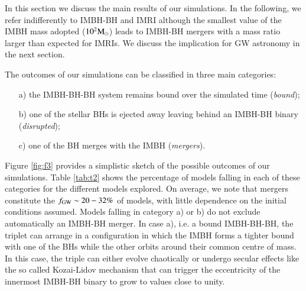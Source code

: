 \documentclass[article]{aa}
\newcommand{\Ms}{{\rm M}_\odot}
\begin{document}
{\bf

In this section we discuss the main results of our simulations. In the following, we refer indifferently to IMBH-BH and IMRI although the smallest value of the IMBH mass adopted ($10^2\Ms$) leads to IMBH-BH mergers with a mass ratio larger than expected for IMRIs. We discuss the implication for GW astronomy in the next section. 

The outcomes of our simulations can be classified in three main categories: 
\begin{itemize}
\item[a)] the IMBH-BH-BH system remains bound over the simulated time ({\it bound});
\item[b)] one of the stellar BHs is ejected away leaving behind an IMBH-BH binary ({\it disrupted}); 
\item[c)] one of the BH merges with the IMBH ({\it mergers}). 
\end{itemize}
Figure \ref{fig:f3} provides a simplistic sketch of the possible outcomes of our simulations. Table \ref{tab:t2} shows the percentage of models falling in each of these categories for the different models explored. On average, we note that mergers constitute the $f_{\rm GW} \sim 20-32\%$ of models, with little dependence on the initial conditions assumed. 
Models falling in category a) or b) do not exclude automatically an IMBH-BH merger. In case a), i.e. a bound IMBH-BH-BH, the triplet can arrange in a configuration in which the IMBH forms a tighter bound with one of the BHs while the other orbits around their common centre of mass. In this case, the triple can either evolve chaotically or undergo secular effects like the so called Kozai-Lidov mechanism \citep{kozai62,lidov62} that can trigger the eccentricity of the innermost IMBH-BH binary to grow to values close to unity. 

}
\end{document}
